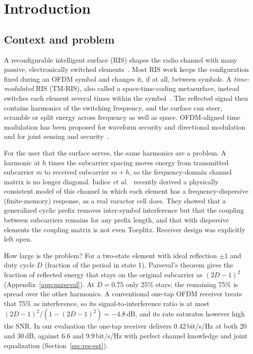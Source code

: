 \section{Introduction}\label{sec:intro}

\subsection{Context and problem}
A reconfigurable intelligent surface (RIS) shapes the radio channel with many
passive, electronically switched elements~\cite{basar2019,wu2019}. Most RIS work
keeps the configuration fixed during an OFDM symbol and changes it, if at all,
between symbols. A \emph{time-modulated} RIS (TM-RIS), also called a
space-time-coding metasurface, instead switches each element several times within
the symbol~\cite{zhang2018}. The reflected signal then contains harmonics of the
switching frequency, and the surface can steer, scramble or split energy across
frequency as well as space. OFDM-aligned time modulation has been proposed for
waveform security and directional modulation~\cite{xu2023tmirs,tao2025gflownet,wang2026generative}
and for joint sensing and security~\cite{tao2025isac}.

For the user that the surface serves, the same harmonics are a problem. A harmonic
at $h$ times the subcarrier spacing moves energy from transmitted subcarrier $m$ to
received subcarrier $m+h$, so the frequency-domain channel matrix is no longer
diagonal. Iudice \emph{et al.}~\cite{iudice2026} recently derived a physically
consistent model of this channel in which each element has a frequency-dispersive
(finite-memory) response, as a real varactor cell does. They showed that a
generalized cyclic prefix removes inter-symbol interference but that the coupling
between subcarriers remains for any prefix length, and that with dispersive elements
the coupling matrix is not even Toeplitz. Receiver design was explicitly left open.

How large is the problem? For a two-state element with ideal reflection $\pm1$ and
duty cycle $D$ (fraction of the period in state 1), Parseval's theorem gives the
fraction of reflected energy that stays on the original subcarrier as
$(2D-1)^2$ (Appendix~\ref{app:parseval}). At $D=0.75$ only 25\% stays; the
remaining 75\% is spread over the other harmonics. A conventional one-tap OFDM
receiver treats that 75\% as interference, so its signal-to-interference ratio is
at most $(2D-1)^2/(1-(2D-1)^2)=-4.8$\,dB, and its rate saturates however high the
SNR. In our evaluation the one-tap receiver delivers 0.42\,bit/s/Hz at both 20 and
30\,dB, against 6.6 and 9.9\,bit/s/Hz with perfect channel knowledge and joint
equalization (Section~\ref{sec:res-est}).

